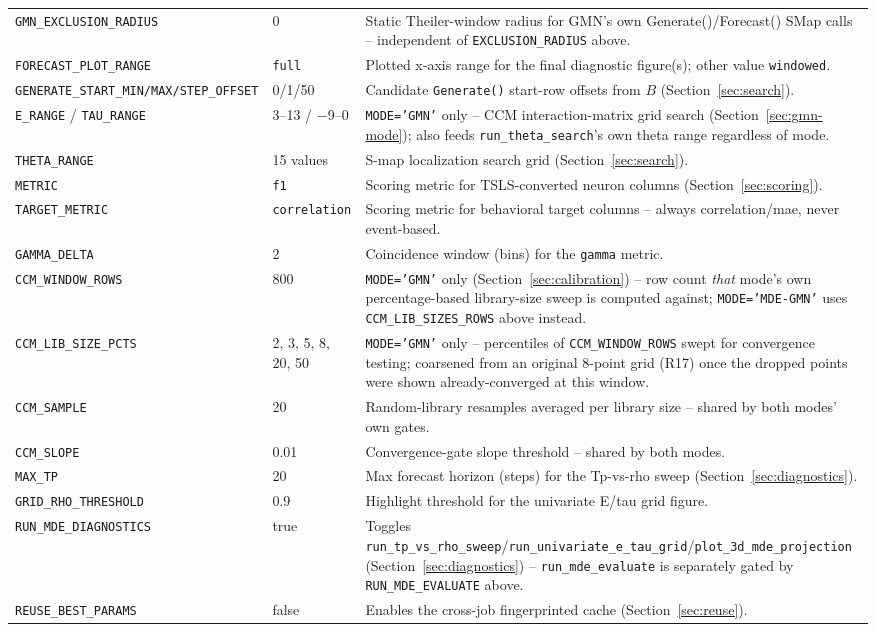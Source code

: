 \documentclass[11pt]{article}
\begin{document}
\begin{longtable}{@{}>{\raggedright\arraybackslash}p{4.0cm}>{\raggedright\arraybackslash\small}p{2.6cm}>{\raggedright\arraybackslash}p{7.9cm}@{}}
\texttt{GMN\_EXCLUSION\_RADIUS} & 0 & Static Theiler-window radius for GMN's own Generate()/Forecast() SMap calls -- independent of \texttt{EXCLUSION\_RADIUS} above. \\
\texttt{FORECAST\_PLOT\_RANGE} & \texttt{full} & Plotted x-axis range for the final diagnostic figure(s); other value \texttt{windowed}. \\
\texttt{GENERATE\_START\_MIN/MAX/STEP\_OFFSET} & 0/1/50 & Candidate \texttt{Generate()} start-row offsets from $B$ (Section~\ref{sec:search}). \\
\texttt{E\_RANGE} / \texttt{TAU\_RANGE} & 3--13 / $-$9--0 & \texttt{MODE='GMN'} only -- CCM interaction-matrix grid search (Section~\ref{sec:gmn-mode}); also feeds \texttt{run\_theta\_search}'s own theta range regardless of mode. \\
\texttt{THETA\_RANGE} & 15 values & S-map localization search grid (Section~\ref{sec:search}). \\
\texttt{METRIC} & \texttt{f1} & Scoring metric for TSLS-converted neuron columns (Section~\ref{sec:scoring}). \\
\texttt{TARGET\_METRIC} & \texttt{correlation} & Scoring metric for behavioral target columns -- always correlation/mae, never event-based. \\
\texttt{GAMMA\_DELTA} & 2 & Coincidence window (bins) for the \texttt{gamma} metric. \\
\texttt{CCM\_WINDOW\_ROWS} & 800 & \texttt{MODE='GMN'} only (Section~\ref{sec:calibration}) -- row count \emph{that} mode's own percentage-based library-size sweep is computed against; \texttt{MODE='MDE-GMN'} uses \texttt{CCM\_LIB\_SIZES\_ROWS} above instead. \\
\texttt{CCM\_LIB\_SIZE\_PCTS} & 2, 3, 5, 8, 20, 50 & \texttt{MODE='GMN'} only -- percentiles of \texttt{CCM\_WINDOW\_ROWS} swept for convergence testing; coarsened from an original 8-point grid (R17) once the dropped points were shown already-converged at this window. \\
\texttt{CCM\_SAMPLE} & 20 & Random-library resamples averaged per library size -- shared by both modes' own gates. \\
\texttt{CCM\_SLOPE} & 0.01 & Convergence-gate slope threshold -- shared by both modes. \\
\texttt{MAX\_TP} & 20 & Max forecast horizon (steps) for the Tp-vs-rho sweep (Section~\ref{sec:diagnostics}). \\
\texttt{GRID\_RHO\_THRESHOLD} & 0.9 & Highlight threshold for the univariate E/tau grid figure. \\
\texttt{RUN\_MDE\_DIAGNOSTICS} & true & Toggles \texttt{run\_tp\_vs\_rho\_sweep}/\texttt{run\_univariate\_e\_tau\_grid}/\texttt{plot\_3d\_mde\_projection} (Section~\ref{sec:diagnostics}) -- \texttt{run\_mde\_evaluate} is separately gated by \texttt{RUN\_MDE\_EVALUATE} above. \\
\texttt{REUSE\_BEST\_PARAMS} & false & Enables the cross-job fingerprinted cache (Section~\ref{sec:reuse}). \\
\bottomrule
\end{longtable}
\end{document}
